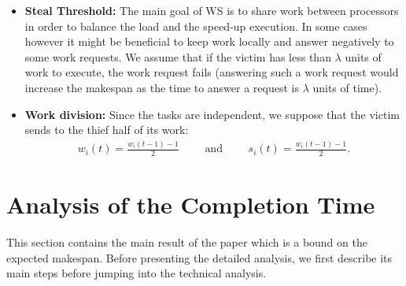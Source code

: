 \begin{itemize}
%
\item \textbf{Steal Threshold:} The main goal of WS is to share work
  between processors in order to balance the load and the speed-up
  execution. In some cases however it might be beneficial to keep
  work locally and answer negatively to some work requests. 
  We assume that if the victim has less than
  $\lambda$ units of work to execute, the work request fails
  (answering such a work request would increase the makespan as the
  time to answer a request is $\lambda$ units of time).

\item \textbf{Work division:} Since the tasks are independent, we suppose
    that the victim sends to the thief half of its work:
  \begin{align*}
        w_i(t)=\frac{w_i(t -1) - 1}2  \qquad\text{ and }\qquad s_i(t)=\frac{w_i(t-1)-1}2.
  \end{align*}
      
\end{itemize} 

\section{Analysis of the Completion Time}
\label{sec:analysis_indep}

This section contains the main result of the paper which is a bound on
the expected makespan. Before presenting the detailed analysis, we
first describe its main steps before jumping into the technical
analysis.

